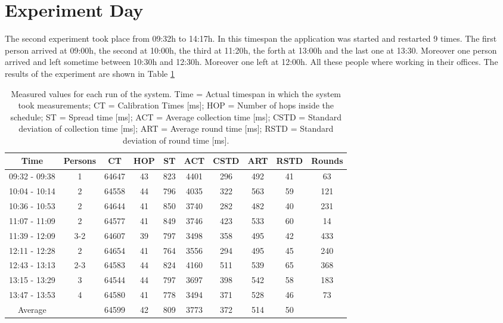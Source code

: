\section{Experiment Day}
The second experiment took place from 09:32h to 14:17h. In this timespan the application was started and restarted 9 times. The first person arrived at 09:00h, the second at 10:00h, the third at 11:20h, the forth at 13:00h and the last one at 13:30. Moreover one person arrived and left sometime between 10:30h and 12:30h. Moreover one left at 12:00h. All these people where working in their offices.
The results of the experiment are shown in Table \ref{tab:DayTable}
\begin{table}[htbp]
 \caption{Measured values for each run of the system. Time = Actual timespan in which the system took measurements; CT = Calibration Times [ms]; HOP = Number of hops inside the schedule; ST = Spread time [ms]; ACT = Average collection time [ms]; CSTD = Standard deviation of collection time [ms]; ART = Average round time [ms]; RSTD = Standard deviation of round time [ms].}
 \centering
 \begin{tabular}{c|c||c|c|c|c|c|c|c|c}
  Time & Persons & CT & HOP & ST & ACT & CSTD & ART & RSTD & Rounds\\ \toprule
  09:32 - 09:38 & 1 & 64647 & 43 & 823 & 4401 & 296 & 492 & 41 & 63\\ 
  10:04 - 10:14 & 2 & 64558 & 44 & 796 & 4035 & 322 & 563 & 59 & 121\\
  10:36 - 10:53 & 2 & 64644 & 41 & 850 & 3740 & 282 & 482 & 40 & 231\\
  11:07 - 11:09 & 2 & 64577 & 41 & 849 & 3746 & 423 & 533 & 60 & 14\\ 
  11:39 - 12:09 & 3-2 & 64607 & 39 & 797 & 3498 & 358 & 495 & 42 & 433\\
  12:11 - 12:28 & 2 & 64654 & 41 & 764 & 3556 & 294 & 495 & 45 & 240\\
  12:43 - 13:13 & 2-3 & 64583 & 44 & 824 & 4160 & 511 & 539 & 65 & 368\\
  13:15 - 13:29 & 3 & 64544 & 44 & 797 & 3697 & 398 & 542 & 58 & 183\\
  13:47 - 13:53 & 4 & 64580 & 41 & 778 & 3494 & 371 & 528 & 46 & 73\\ \toprule
  Average & & 64599 & 42 & 809 & 3773 & 372 & 514 & 50 & \\
 \end{tabular}
 \label{tab:DayTable}
\end{table}

